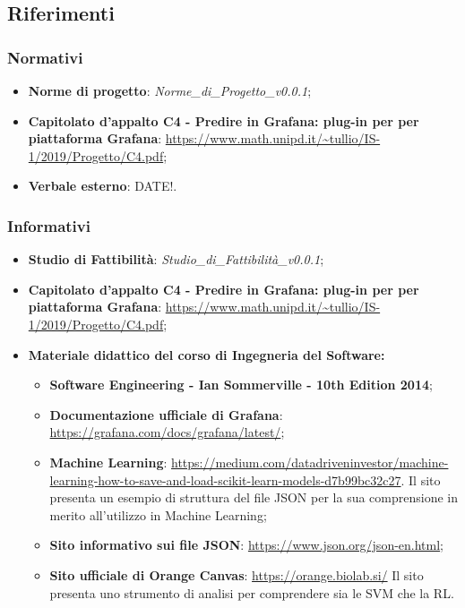 	\subsection{Riferimenti}
		\subsubsection{Normativi}
			\begin{itemize}
				\item \textbf{Norme di progetto}: \emph{Norme\_di\_Progetto\_v0.0.1};
				\item \textbf{Capitolato d'appalto C4 - Predire in Grafana: plug-in per per piattaforma Grafana}: \url{https://www.math.unipd.it/~tullio/IS-1/2019/Progetto/C4.pdf};
				\item \textbf{Verbale esterno}: DATE!. 
			\end{itemize}
		
		\subsubsection{Informativi}
			\begin{itemize}
				\item \textbf{Studio di Fattibilità}: \emph{Studio\_di\_Fattibilità\_v0.0.1};
				\item \textbf{Capitolato d'appalto C4 - Predire in Grafana: plug-in per per piattaforma Grafana}: \url{https://www.math.unipd.it/~tullio/IS-1/2019/Progetto/C4.pdf};
				\item \textbf{Materiale didattico del corso di Ingegneria del Software:}
				\begin{itemize}
					\item \textbf{Software Engineering - Ian Sommerville - 10th Edition 2014};
					\item \textbf{Documentazione ufficiale di Grafana}: \url{https://grafana.com/docs/grafana/latest/};
					\item \textbf{Machine Learning}: \url{https://medium.com/datadriveninvestor/machine-learning-how-to-save-and-load-scikit-learn-models-d7b99bc32c27}. Il sito presenta un esempio di struttura del file JSON per la sua comprensione in merito all'utilizzo in Machine Learning;
					\item \textbf{Sito informativo sui file JSON}: \url{https://www.json.org/json-en.html};
					\item \textbf{Sito ufficiale di Orange Canvas}: \url{https://orange.biolab.si/} Il sito presenta uno strumento di analisi per comprendere sia le SVM che la RL. 
				\end{itemize}
			\end{itemize}				
	